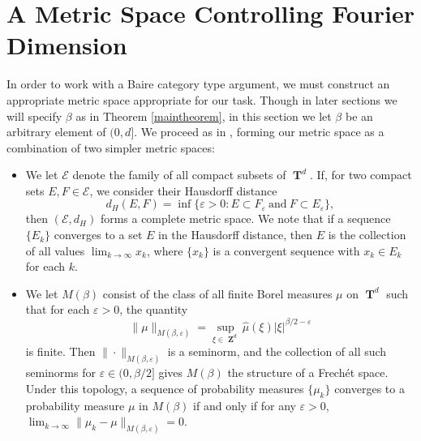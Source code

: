 \documentclass[12pt,reqno]{article}
\numberwithin{equation}{section}
\DeclareMathOperator{\ZZ}{\mathbf{Z}}
\DeclareMathOperator{\TT}{\mathbf{T}}
\begin{document}
\section{A Metric Space Controlling Fourier Dimension}

In order to work with a Baire category type argument, we must construct an appropriate metric space appropriate for our task. Though in later sections we will specify $\beta$ as in Theorem \ref{maintheorem}, in this section we let $\beta$ be an arbitrary element of $(0,d]$. We proceed as in \cite{Korner2}, forming our metric space as a combination of two simpler metric spaces:
%
\begin{itemize}
    \item We let $\mathcal{E}$ denote the family of all compact subsets of $\TT^d$. If, for two compact sets $E,F \in \mathcal{E}$, we consider their Hausdorff distance
    \[ d_H(E,F) = \inf \{ \varepsilon > 0 : E \subset F_\varepsilon\ \text{and}\ F \subset E_\varepsilon \}, \]
    then $(\mathcal{E},d_H)$ forms a complete metric space. We note that if a sequence $\{ E_k \}$ converges to a set $E$ in the Hausdorff distance, then $E$ is the collection of all values $\lim_{k \to \infty} x_k$, where $\{ x_k \}$ is a convergent sequence with $x_k \in E_k$ for each $k$.

    \item We let $M(\beta)$ consist of the class of all finite Borel measures $\mu$ on $\TT^d$ such that for each $\varepsilon > 0$, the quantity
    \[ \| \mu \|_{M(\beta,\varepsilon)} = \sup_{\xi \in \ZZ^d} \widehat{\mu}(\xi) |\xi|^{\beta/2 - \varepsilon} \]
    is finite. Then $\| \cdot \|_{M(\beta,\varepsilon)}$ is a seminorm, and the collection of all such seminorms for $\varepsilon \in (0,\beta/2]$ gives $M(\beta)$ the structure of a Frech\'{e}t space. Under this topology, a sequence of probability measures $\{ \mu_k \}$ converges to a probability measure $\mu$ in $M(\beta)$ if and only if for any $\varepsilon > 0$, $\lim_{k \to \infty} \| \mu_k - \mu \|_{M(\beta,\varepsilon)} = 0$.
\end{itemize}
\end{document}
